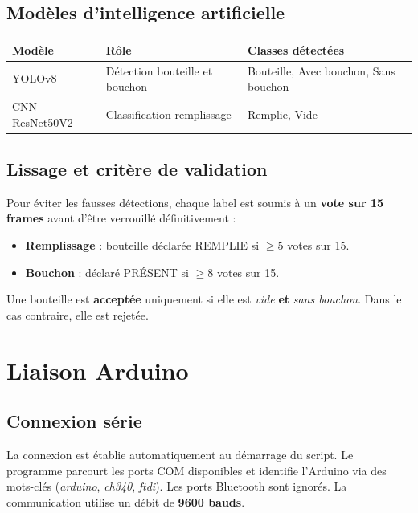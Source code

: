 \documentclass[11pt,a4paper]{article}
\begin{document}
\subsection{Modèles d'intelligence artificielle}

\begin{center}
\begin{tabular}{p{3cm} p{5.5cm} p{4.5cm}}
\toprule
\textbf{Modèle} & \textbf{Rôle} & \textbf{Classes détectées} \\
\midrule
YOLOv8         & Détection bouteille et bouchon    & Bouteille, Avec bouchon, Sans bouchon \\
CNN ResNet50V2 & Classification remplissage        & Remplie, Vide \\
\bottomrule
\end{tabular}
\end{center}

\subsection{Lissage et critère de validation}

Pour éviter les fausses détections, chaque label est soumis à un \textbf{vote sur
15 frames} avant d'être verrouillé définitivement :

\begin{itemize}[noitemsep]
  \item \textbf{Remplissage} : bouteille déclarée REMPLIE si $\geq 5$ votes sur 15.
  \item \textbf{Bouchon} : déclaré PRÉSENT si $\geq 8$ votes sur 15.
\end{itemize}

Une bouteille est \textbf{acceptée} uniquement si elle est \textit{vide} \textbf{et}
\textit{sans bouchon}. Dans le cas contraire, elle est rejetée.

\section{Liaison Arduino}

\subsection{Connexion série}

La connexion est établie automatiquement au démarrage du script. Le programme
parcourt les ports COM disponibles et identifie l'Arduino via des mots-clés
(\textit{arduino}, \textit{ch340}, \textit{ftdi}). Les ports Bluetooth sont
ignorés. La communication utilise un débit de \textbf{9600 bauds}.
\end{document}

